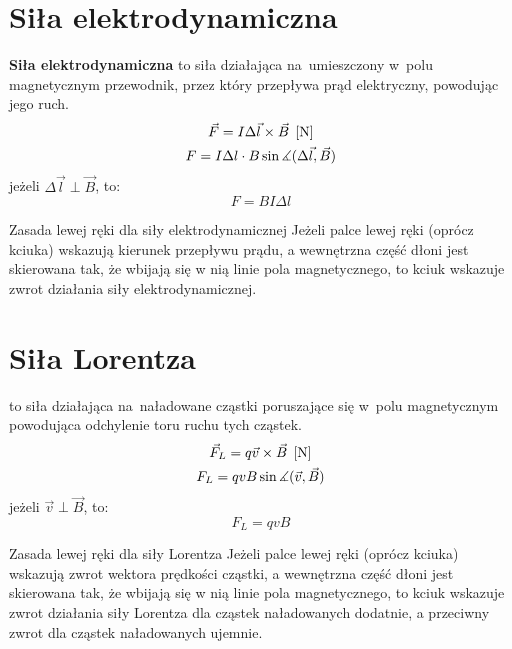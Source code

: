 \section{Siła elektrodynamiczna}
\begin{definition}
  \textbf{Siła elektrodynamiczna} to siła działająca na~umieszczony w~polu magnetycznym przewodnik,
  przez który przepływa prąd elektryczny, powodując jego ruch.
  \begin{gather*}
    \vec F = I \Delta \vec l \times \vec B \;\left[\mathrm{N}\right]\\
    F = I \Delta l \cdot B \sin\measuredangle(\Delta\vec l, \vec B)
  \end{gather*}
  jeżeli $\Delta \vec l \perp \vec B$, to:
  \begin{equation}
    \boxed{F = BI \Delta l}
  \end{equation}
\end{definition}

\begin{law}{Zasada lewej ręki dla siły elektrodynamicznej}
  Jeżeli palce lewej ręki (oprócz kciuka) wskazują kierunek przepływu prądu, a wewnętrzna część
  dłoni jest skierowana tak, że wbijają się w nią linie pola magnetycznego, to kciuk wskazuje zwrot
  działania siły elektrodynamicznej.
\end{law}

\section{Siła Lorentza}
\begin{definition}
   to siła działająca na~naładowane cząstki poruszające się w~polu magnetycznym
  powodująca odchylenie toru ruchu tych cząstek.
  \begin{gather*}
    \vec F_L = q \vec v \times \vec B \;\left[\mathrm{N}\right]\\
    F_L = qvB \sin\measuredangle(\vec v, \vec B)
  \end{gather*}
  jeżeli $\vec v \perp \vec B$, to:
  \begin{equation}
    \boxed{F_L = qvB}
  \end{equation}
\end{definition}

\begin{law}{Zasada lewej ręki dla siły Lorentza}
  Jeżeli palce lewej ręki (oprócz kciuka) wskazują zwrot wektora prędkości cząstki, a wewnętrzna
  część dłoni jest skierowana tak, że wbijają się w nią linie pola magnetycznego, to kciuk wskazuje
  zwrot działania siły Lorentza dla cząstek naładowanych dodatnie, a przeciwny zwrot dla cząstek
  naładowanych ujemnie.
\end{law}

